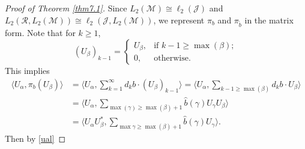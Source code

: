 \documentclass[oneside,english,a4wide]{amsart}
\numberwithin{equation}{section}
\numberwithin{figure}{section}
\theoremstyle{plain}
\theoremstyle{plain}
\theoremstyle{definition}
\theoremstyle{plain}
\theoremstyle{remark}
\theoremstyle{definition}
\theoremstyle{remark}
\theoremstyle{definition}
\newcommand{\8}{\infty}
\begin{document}
\begin{proof}[Proof of Theorem \ref{thm7.1}]
	
	
	Since $L_2(\mathscr{M})\cong \ell_2(\mathcal{J})$ and $L_2(\mathcal{R},L_2(\mathscr{M}))\cong \ell_2(\mathcal{J},L_2(\mathscr{M}))$, we represent $\pi_b$ and $\pi_{\tilde{b}}$ in the matrix form. Note that for $k\ge 1$,
	\begin{equation*}
		(U_\beta)_{k-1}=
		\begin{cases}
			U_\beta,& \text{if $k-1\ge \max(\beta)$};\\
			0,& \text{otherwise}.
		\end{cases}
	\end{equation*}
	This implies
	\begin{equation*}
		\begin{aligned}
			\langle U_\alpha,\pi_b (U_\beta)\rangle{}&=\langle U_\alpha,\sum_{k=1}^\infty d_kb\cdot(U_\beta)_{k-1}\rangle=\langle U_\alpha,\sum_{k-1\ge \max(\beta)}d_kb\cdot U_\beta\rangle\\&=\langle U_\alpha,\sum_{\max (\gamma)\ge \max(\beta)+1}\hat{b}(\gamma)U_\gamma U_\beta\rangle\\&=\langle U_\alpha U_\beta^*,\sum_{\max \gamma\ge \max(\beta)+1}\hat{b}(\gamma)U_\gamma\rangle.
		\end{aligned}
	\end{equation*}
	Then by \eqref{ual}
	

\end{proof}
\end{document}
